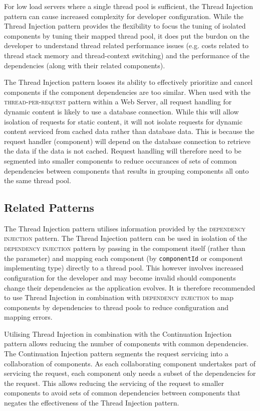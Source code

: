 \documentclass[prodmode]{style/acmlarge}
\begin{document}
For low load servers where a single thread pool is sufficient, the Thread
Injection pattern can cause increased complexity for developer configuration.
While the Thread Injection pattern provides the flexibility to focus the tuning
of isolated components by tuning their mapped thread pool, it does put the
burdon on the developer to understand thread related performance issues (e.g.
costs related to thread stack memory and thread-context switching) and the
performance of the dependencies (along with their related components).

The Thread Injection pattern looses its ability to effectively prioritize and
cancel components if the component dependencies are too similar.  When used with
the \textsc{thread-per-request} pattern within a Web Server, all request
handling for dynamic content is likely to use a database connection.  While this
will allow isolation of requests for static content, it will not isolate
requests for dynamic content serviced from cached data rather than database
data.  This is because the request handler (component) will depend on the
database connection to retrieve the data if the data is not cached.  Request
handling will therefore need to be segmented into smaller components to reduce
occurances of sets of common dependencies between components that results in
grouping components all onto the same thread pool.


\subsection{Related Patterns}

The Thread Injection pattern utilises information provided by the
\textsc{dependency injection} pattern.  The Thread Injection pattern can be used
in isolation of the \textsc{dependency injection} pattern by passing in the
compoment itself (rather than the parameter) and mapping each component (by
\texttt{componentId} or component implementing type) directly to a thread pool. 
This however involves increased configuration for the developer and may become
invalid should components change their dependencies as the application evolves. 
It is therefore recommended to use Thread Injection in combination with
\textsc{dependency injection} to map components by dependencies to thread pools
to reduce configuration and mapping errors.

Utilising Thread Injection in combination with the Continuation Injection
pattern allows reducing the number of components with common dependencies.  The
Continuation Injection pattern segments the request servicing into a
collaboration of components.  As each collaborating component undertakes part of
servicing the request, each component only needs a subset of the dependencies
for the request.  This allows reducing the servicing of the request to smaller
components to avoid sets of common dependencies between components that negates
the effectiveness of the Thread Injection pattern.
\end{document}
